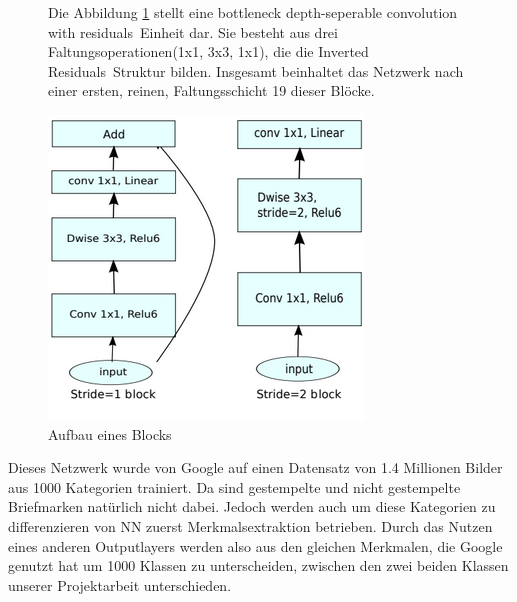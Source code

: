 \documentclass[12pt,toc=bib,toc=listof]{scrreprt}
\begin{document}
\begin{figure}[h]
\begin{minipage}[t]{.51\linewidth}

Die Abbildung \ref{fig:nn_arc} stellt eine \dq bottleneck depth-seperable convolution with residuals\dq\  Einheit dar. Sie besteht aus drei Faltungsoperationen(1x1, 3x3, 1x1), die die \dq Inverted Residuals\dq\ Struktur bilden. Insgesamt beinhaltet das Netzwerk nach einer ersten, reinen, Faltungsschicht 19 dieser Blöcke.
\end{minipage}
\hfill
\begin{minipage}[t]{.44\linewidth}
\strut\vspace*{-\baselineskip}
\newline
  \includegraphics[width=\linewidth]{./../bilder/mobnet_arc}
  \caption{Aufbau eines Blocks \cite{sandler2019mobilenetv2}}
  \label{fig:nn_arc}
\end{minipage}
\end{figure}

Dieses Netzwerk wurde von Google auf einen Datensatz von 1.4 Millionen Bilder aus 1000 Kategorien trainiert. Da sind gestempelte und nicht gestempelte Briefmarken natürlich nicht dabei. Jedoch werden auch um diese Kategorien zu differenzieren von NN zuerst Merkmalsextraktion betrieben. Durch das Nutzen eines anderen Outputlayers werden also aus den gleichen Merkmalen, die Google genutzt hat um 1000 Klassen zu unterscheiden, zwischen den zwei beiden Klassen unserer Projektarbeit unterschieden.
 
\end{document}
